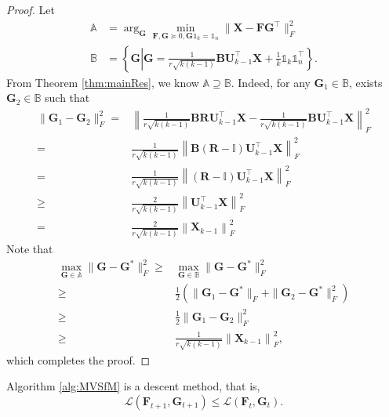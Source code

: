 \documentclass[journal]{IEEEtran}
\begin{document}
\begin{proof}
	Let
	\[
	\begin{aligned}
	\mathbb{A} &= \arg_{\mathbf{G}}\min_{\mathbf{F},\mathbf{G}\succeq 0,\mathbf{G}\mathbb{1}_k = \mathbb{1}_n} \| \mathbf{X} - \mathbf{FG}^\top\|_F^2 \\
	\mathbb{B} &= \left\{ \mathbf{G} \left|  \mathbf{G}=\frac{1}{r\sqrt{k(k-1)}}\mathbf{B}\mathbf{U}_{k-1}^\top\mathbf{X}+\frac{1}{k}\mathbb{1}_k\mathbb{1}_n^\top \right.\right\}.
	\end{aligned}
	\]
	From Theorem \ref{thm:mainRes}, we know $\mathbb{A}\supseteq \mathbb{B}$. Indeed, for any $\mathbf{G}_1 \in \mathbb{B}$, exists $\mathbf{G}_2 \in \mathbb{B}$ such that
	\[
	\begin{aligned}
	\|\mathbf{G}_1 - \mathbf{G}_2\|_F^2=&\left\| \frac{1}{r\sqrt{k(k-1)}}\mathbf{B}\mathbf{R}\mathbf{U}_{k-1}^\top\mathbf{X}
	-\frac{1}{r\sqrt{k(k-1)}}\mathbf{B}\mathbf{U}_{k-1}^\top\mathbf{X} \right\|_F^2 \\
	=&\frac{1}{r\sqrt{k(k-1)}} \left\| \mathbf{B}(\mathbf{R}-\mathbb{I})\mathbf{U}_{k-1}^\top\mathbf{X}\right\|_F^2 \\
	=&\frac{1}{r\sqrt{k(k-1)}} \left\|(\mathbf{R}-\mathbb{I})\mathbf{U}_{k-1}^\top\mathbf{X}\right\|_F^2 \\
	\geq& \frac{2}{r\sqrt{k(k-1)}} \left\|\mathbf{U}_{k-1}^\top\mathbf{X}\right\|_F^2 \\
	=& \frac{2}{r\sqrt{k(k-1)}} \left\|\mathbf{X}_{k-1}\right\|_F^2 
	\end{aligned}
	\]
	Note that
	\[
	\begin{aligned}
	\max_{\mathbf{G}\in\mathbb{A}} \| \mathbf{G} - \mathbf{G}^* \|_F^2 
	\geq & \max_{\mathbf{G}\in\mathbb{B}} \| \mathbf{G} - \mathbf{G}^* \|_F^2 \\
	\geq & \frac{1}{2}\left(\|\mathbf{G}_1 - \mathbf{G}^*\|_F + \|\mathbf{G}_2 - \mathbf{G}^*\|_F^2 \right) \\
	\geq & \frac{1}{2} \|\mathbf{G}_1 - \mathbf{G}_2\|_F^2 \\ 
	\geq & \frac{1}{r\sqrt{k(k-1)}} \left\|\mathbf{X}_{k-1}\right\|_F^2,
	\end{aligned}
	\]
	which completes the proof.
\end{proof}
\begin{thmm}[Descent]
	Algorithm \ref{alg:MVSfM} is a descent method, that is,
	\[
	\mathcal{L}(\mathbf{F}_{t+1}, \mathbf{G}_{t+1}) \leq \mathcal{L}(\mathbf{F}_{t}, \mathbf{G}_{t}).
	\]
\end{thmm}
\end{document}
